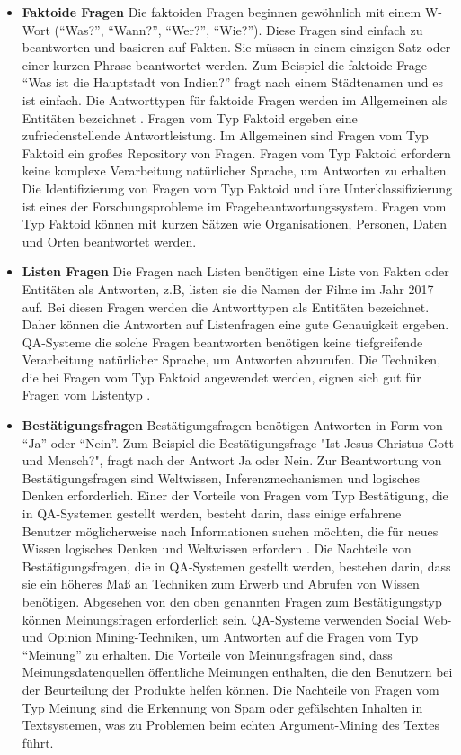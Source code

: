\documentclass[
        ngerman,
        paper=a4,
        numbers=noendperiod,
]{scrreprt}
\begin{document}
\begin{itemize}
    \item \textbf{Faktoide Fragen} 
    Die faktoiden Fragen beginnen gewöhnlich mit einem W-Wort (\enquote{Was?}, \enquote{Wann?}, \enquote{Wer?}, \enquote{Wie?}). Diese Fragen sind einfach zu beantworten und basieren auf Fakten. Sie müssen in einem einzigen Satz oder einer kurzen Phrase beantwortet werden. Zum Beispiel die faktoide Frage \enquote{Was ist die Hauptstadt von Indien?} fragt nach einem Städtenamen und es ist einfach. Die Antworttypen für faktoide Fragen werden im Allgemeinen als Entitäten bezeichnet \citep{khillare2014comparative}. Fragen vom Typ Faktoid ergeben eine zufriedenstellende Antwortleistung. Im Allgemeinen sind Fragen vom Typ Faktoid ein großes Repository von Fragen. Fragen vom Typ Faktoid erfordern keine komplexe Verarbeitung natürlicher Sprache, um Antworten zu erhalten. Die Identifizierung von Fragen vom Typ Faktoid und ihre Unterklassifizierung ist eines der Forschungsprobleme im Fragebeantwortungssystem. Fragen vom Typ Faktoid können mit kurzen Sätzen wie Organisationen, Personen, Daten und Orten beantwortet werden.
    \item \textbf{Listen Fragen}
    Die Fragen nach Listen benötigen eine Liste von Fakten oder Entitäten als Antworten, z.B, listen sie die Namen der Filme im Jahr 2017 auf. Bei diesen Fragen werden die Antworttypen als Entitäten bezeichnet. Daher können die Antworten auf Listenfragen eine gute Genauigkeit ergeben. QA-Systeme die solche Fragen beantworten benötigen keine tiefgreifende Verarbeitung natürlicher Sprache, um Antworten abzurufen. Die Techniken, die bei Fragen vom Typ Faktoid angewendet werden, eignen sich gut für Fragen vom Listentyp \citep{wu2015leveraging}.
    \item \textbf{Bestätigungsfragen} 
    Bestätigungsfragen benötigen Antworten in Form von \enquote{Ja} oder \enquote{Nein}. Zum Beispiel die Bestätigungsfrage "Ist Jesus Christus Gott und Mensch?", fragt nach der Antwort Ja oder Nein. Zur Beantwortung von Bestätigungsfragen sind Weltwissen, Inferenzmechanismen und logisches Denken erforderlich. Einer der Vorteile von Fragen vom Typ Bestätigung, die in QA-Systemen gestellt werden, besteht darin, dass einige erfahrene Benutzer möglicherweise nach Informationen suchen möchten, die für neues Wissen logisches Denken und Weltwissen erfordern \citep{tanwar2014effective}. Die Nachteile von Bestätigungsfragen, die in QA-Systemen gestellt werden, bestehen darin, dass sie ein höheres Maß an Techniken zum Erwerb und Abrufen von Wissen benötigen. Abgesehen von den oben genannten Fragen zum Bestätigungstyp können Meinungsfragen erforderlich sein. QA-Systeme verwenden Social Web- und Opinion Mining-Techniken, um Antworten auf die Fragen vom Typ \enquote{Meinung} zu erhalten. Die Vorteile von Meinungsfragen sind, dass Meinungsdatenquellen öffentliche Meinungen enthalten, die den Benutzern bei der Beurteilung der Produkte helfen können. Die Nachteile von Fragen vom Typ Meinung sind die Erkennung von Spam oder gefälschten Inhalten in Textsystemen, was zu Problemen beim echten Argument-Mining des Textes führt.

\end{itemize}
\end{document}
